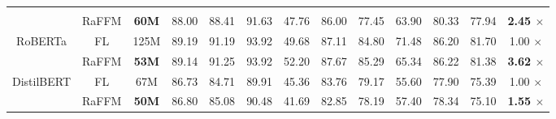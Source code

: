 \begin{table}
{\begin{tabular}{ccccccccccccc}
 &
   &
   &
   &
   &
   &
   &
   &
   &
   &
   &
   &
   \\
 &
  \multirow{2}{*}{RaFFM} &
  \multirow{2}{*}{\textbf{60M}} &
  \multirow{2}{*}{88.00} &
  \multirow{2}{*}{88.41} &
  \multirow{2}{*}{91.63} &
  \multirow{2}{*}{47.76} &
  \multirow{2}{*}{86.00} &
  \multirow{2}{*}{77.45} &
  \multirow{2}{*}{63.90} &
  \multirow{2}{*}{80.33} &
  \multirow{2}{*}{77.94} &
  \multirow{2}{*}{\textbf{2.45 $\times$}} \\
 &
   &
   &
   &
   &
   &
   &
   &
   &
   &
   &
   &
   \\ \hline
\multirow{4}{*}{RoBERTa} &
  \multirow{2}{*}{FL} &
  \multirow{2}{*}{125M} &
  \multirow{2}{*}{89.19}&
  \multirow{2}{*}{91.19} &
  \multirow{2}{*}{93.92} &
  \multirow{2}{*}{49.68} &
  \multirow{2}{*}{87.11} &
  \multirow{2}{*}{84.80} &
  \multirow{2}{*}{71.48} &
  \multirow{2}{*}{86.20} &
  \multirow{2}{*}{81.70} &
  \multirow{2}{*}{1.00 $\times$} \\
 &
   &
   &
   &
   &
   &
   &
   &
   &
   &
   &
   &
   \\
 &
  \multirow{2}{*}{RaFFM} &
  \multirow{2}{*}{\textbf{53M}} &
  \multirow{2}{*}{89.14} &
  \multirow{2}{*}{91.25} &
  \multirow{2}{*}{93.92} &
  \multirow{2}{*}{52.20} &
  \multirow{2}{*}{87.67} &
  \multirow{2}{*}{85.29} &
  \multirow{2}{*}{65.34} &
  \multirow{2}{*}{86.22} &
  \multirow{2}{*}{81.38} &
  \multirow{2}{*}{\textbf{3.62 $\times$}} \\
 &
   &
   &
   &
   &
   &
   &
   &
   &
   &
   &
   &
   \\ \hline
\multirow{4}{*}{DistilBERT} &
  \multirow{2}{*}{FL} &
  \multirow{2}{*}{67M} &
  \multirow{2}{*}{86.73} &
  \multirow{2}{*}{84.71} &
  \multirow{2}{*}{89.91} &
  \multirow{2}{*}{45.36} &
  \multirow{2}{*}{83.76} &
  \multirow{2}{*}{79.17} &
  \multirow{2}{*}{55.60} &
  \multirow{2}{*}{77.90} &
  \multirow{2}{*}{75.39} &
  \multirow{2}{*}{1.00 $\times$} \\
 &
   &
   &
   &
   &
   &
   &
   &
   &
   &
   &
   &
   \\
 &
  \multirow{2}{*}{RaFFM} &
  \multirow{2}{*}{\textbf{50M}} &
  \multirow{2}{*}{86.80} &
  \multirow{2}{*}{85.08} &
  \multirow{2}{*}{90.48} &
  \multirow{2}{*}{41.69} &
  \multirow{2}{*}{82.85} &
  \multirow{2}{*}{78.19} &
  \multirow{2}{*}{57.40} &
  \multirow{2}{*}{78.34} &
  \multirow{2}{*}{75.10} &
  \multirow{2}{*}{\textbf{1.55 $\times$} }\\
 &
   &
   &
   &
   &
   &
   &
   &
   &
   &
   &
   &
   \\ \hline \toprule
\end{tabular}%
}
\end{table}